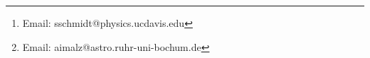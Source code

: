 
\author[LSST Dark Energy Science Collaboration]{
\parbox{\textwidth}{
\Large
S.J.~Schmidt$^{1}$\thanks{Email: sschmidt@physics.ucdavis.edu},
A.I.~Malz$^{2,3,4}$\thanks{Email: aimalz@astro.ruhr-uni-bochum.de},
J.Y.H.~Soo$^{5,6}$,
I.A.~Almosallam$^{7,8}$,
M.~Brescia$^{9}$,
S.~Cavuoti$^{9,10}$,
J.~Cohen-Tanugi$^{11}$,
A.J.~Connolly$^{12}$,
J.~DeRose$^{13,14,15,16,17}$,
P.E.~Freeman$^{18}$,
M.L.~Graham$^{12}$,
K.G.~Iyer$^{19,20}$,
M.J.~Jarvis$^{21,22}$,
J.B.~Kalmbach$^{12}$,
E.~Kovacs$^{23}$,
A.B.~Lee$^{18}$,
G.~Longo$^{10}$,
C.B.~Morrison$^{12}$,
J.A.~Newman$^{24}$,
E.~Nourbakhsh$^{1}$,
E.~Nuss$^{11}$,
T.~Pospisil$^{18}$,
H.~Tranin$^{11}$,
R.H.~Wechsler$^{25,16,26}$,
R.~Zhou$^{15,24}$,
R.~Izbicki$^{27,28}$,
and The LSST Dark Energy Science Collaboration
}
\vspace{0.4cm}
\\
\parbox{\textwidth}{
(Affiliations are listed at the end of the paper)
\vspace{0.8cm}
}
}
